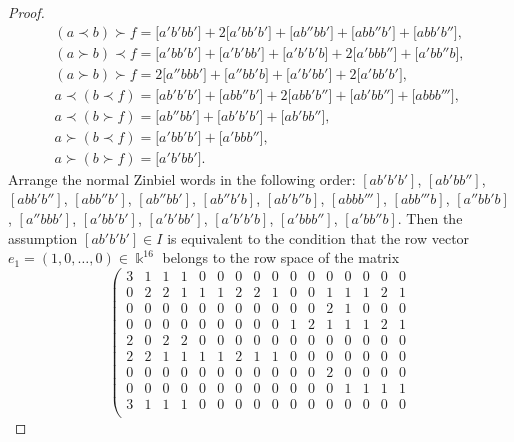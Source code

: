 \documentclass[11pt]{article}
\numberwithin{equation}{section}
\numberwithin{equation}{section}
\begin{document}
\begin{proof}
\begin{gather*}
%
(a\prec b)\succ f
 = \bigl[a'b'bb'\bigr]+2\bigl[a'bb'b'\bigr] + \bigl[ab''bb'\bigr]+\bigl[abb''b'\bigr]+\bigl[abb'b''\bigr], \\
%
(a\succ b)\prec f
 = \bigl[a'bb'b'\bigr]+\bigl[a'b'bb'\bigr]+\bigl[a'b'b'b\bigr] + 2\bigl[a'bbb''\bigr]+\bigl[a'bb''b\bigr], \\
%
(a\succ b)\succ f
 = 2\bigl[a''bbb'\bigr]+\bigl[a''bb'b\bigr]+\bigl[a'b'bb'\bigr]+2\bigl[a'bb'b'\bigr], \\
%
a\prec (b\prec f)
 = \bigl[ab'b'b'\bigr]+\bigl[abb''b'\bigr] +2\bigl[abb'b''\bigr] +\bigl[ab'bb''\bigr] + \bigl[abbb'''\bigr], \\
%
a\prec (b\succ f)
 = \bigl[ab''bb'\bigr]+\bigl[ab'b'b'\bigr]+\bigl[ab'bb''\bigr], \\
%
a\succ (b\prec f)
 = \bigl[a'bb'b'\bigr] + \bigl[a'bbb''\bigr], \\
%
a\succ (b\succ f)
 = \bigl[a'b'bb'\bigr].
\end{gather*}
Arrange the normal Zinbiel words in the following order:
$[ab'b'b']$, $[ab'bb'']$, $[abb'b'']$, $[abb''b']$, $[ab''bb']$, $[ab''b'b]$, $[ab'b''b]$, $[abbb''']$, $[abb'''b]$, $[a''bb'b]$, $[a''bbb']$, $[a'bb'b']$, $[a'b'bb']$, $[a'b'b'b]$, $[a'bbb'']$, $[a'bb''b]$.
Then the assumption $[ab'b'b']\in I$ is equivalent to the condition
that the row vector $e_1 = (1,0,\dots ,0)\in \Bbbk ^{16}$
belongs to the row space of the matrix
%
\[ \left(
\begin{array}{cccccccccccccccc}
3& 1& 1& 1& 0& 0& 0& 0& 0& 0& 0& 0& 0& 0& 0& 0\\
0& 2& 2& 1& 1& 1& 2& 2& 1& 0& 0& 1& 1& 1& 2& 1\\
0& 0& 0& 0& 0& 0& 0& 0& 0& 0& 0& 2& 1& 0& 0& 0\\
0& 0& 0& 0& 0& 0& 0& 0& 0& 1& 2& 1& 1& 1& 2& 1\\
2& 0& 2& 2& 0& 0& 0& 0& 0& 0& 0& 0& 0& 0& 0& 0\\
2& 2& 1& 1& 1& 1& 2& 1& 1& 0& 0& 0& 0& 0& 0& 0\\
0& 0& 0& 0& 0& 0& 0& 0& 0& 0& 0& 2& 0& 0& 0& 0\\
0& 0& 0& 0& 0& 0& 0& 0& 0& 0& 0& 0& 1& 1& 1& 1\\
3& 1& 1& 1& 0& 0& 0& 0& 0& 0& 0& 0& 0& 0& 0& 0\\

\end{array}\]
\end{proof}
\end{document}
